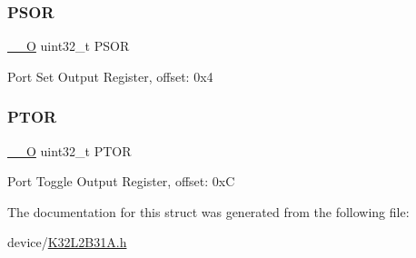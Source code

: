 \subsubsection{\texorpdfstring{PSOR}{PSOR}}
{\footnotesize\ttfamily \mbox{\hyperlink{core__cm0plus_8h_a7e25d9380f9ef903923964322e71f2f6}{\+\_\+\+\_\+O}} uint32\+\_\+t P\+S\+OR}

Port Set Output Register, offset\+: 0x4 \mbox{\label{struct_f_g_p_i_o___type_a1c26bce9144a9606d3f8a60dc750b063}} 
\subsubsection{\texorpdfstring{PTOR}{PTOR}}
{\footnotesize\ttfamily \mbox{\hyperlink{core__cm0plus_8h_a7e25d9380f9ef903923964322e71f2f6}{\+\_\+\+\_\+O}} uint32\+\_\+t P\+T\+OR}

Port Toggle Output Register, offset\+: 0xC 

The documentation for this struct was generated from the following file\+:\begin{DoxyCompactItemize}
\item 
device/\mbox{\hyperlink{_k32_l2_b31_a_8h}{K32\+L2\+B31\+A.\+h}}\end{DoxyCompactItemize}
